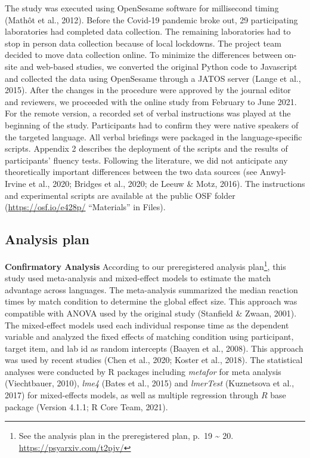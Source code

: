 \documentclass[
  man,floatsintext]{apa6}
\begin{document}
The study was executed using OpenSesame software for millisecond timing (Mathôt et al., 2012). Before the Covid-19 pandemic broke out, 29 participating laboratories had completed data collection. The remaining laboratories had to stop in person data collection because of local lockdowns. The project team decided to move data collection online. To minimize the differences between on-site and web-based studies, we converted the original Python code to Javascript and collected the data using OpenSesame through a JATOS server (Lange et al., 2015). After the changes in the procedure were approved by the journal editor and reviewers, we proceeded with the online study from February to June 2021. For the remote version, a recorded set of verbal instructions was played at the beginning of the study. Participants had to confirm they were native speakers of the targeted language. All verbal briefings were packaged in the language-specific scripts. Appendix 2 describes the deployment of the scripts and the results of participants' fluency tests. Following the literature, we did not anticipate any theoretically important differences between the two data sources (see Anwyl-Irvine et al., 2020; Bridges et al., 2020; de Leeuw \& Motz, 2016). The instructions and experimental scripts are available at the public OSF folder (\url{https://osf.io/e428p/} ``Materials'' in Files).

\hypertarget{analysis-plan}{%
\subsection{Analysis plan}\label{analysis-plan}}

\textbf{Confirmatory Analysis} According to our preregistered analysis plan\footnote{See the analysis plan in the preregistered plan, p.~19 \textasciitilde{} 20. \url{https://psyarxiv.com/t2pjv/}}, this study used meta-analysis and mixed-effect models to estimate the match advantage across languages. The meta-analysis summarized the median reaction times by match condition to determine the global effect size. This approach was compatible with ANOVA used by the original study (Stanfield \& Zwaan, 2001). The mixed-effect models used each individual response time as the dependent variable and analyzed the fixed effects of matching condition using participant, target item, and lab id as random intercepts (Baayen et al., 2008). This approach was used by recent studies (Chen et al., 2020; Koster et al., 2018). The statistical analyses were conducted by R packages including \emph{metafor} for meta analysis (Viechtbauer, 2010), \emph{lme4} (Bates et al., 2015) and \emph{lmerTest} (Kuznetsova et al., 2017) for mixed-effects models, as well as multiple regression through \(R\) base package (Version 4.1.1; R Core Team, 2021).
\end{document}

